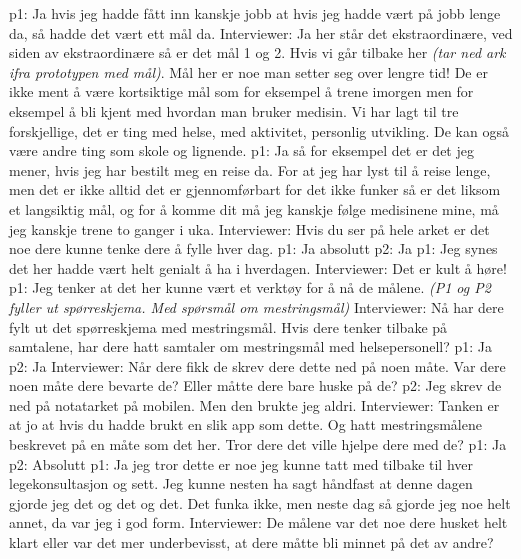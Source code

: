 \documentclass[11pt, norsk, a4paper]{article}
\begin{document}
\textcolor{myGreen} {p1: }Ja hvis jeg hadde fått inn kanskje jobb at hvis jeg hadde vært på jobb lenge da, så hadde det vært ett mål da.
\textcolor{myBlue} {Interviewer: }Ja her står det ekstraordinære, ved siden av ekstraordinære så er det mål 1 og 2. Hvis vi går tilbake her \textcolor{myGrey}{\textit{(tar ned ark ifra prototypen med mål)}}. Mål her er noe man setter seg over lengre tid! De er ikke ment å være kortsiktige mål som for eksempel å trene imorgen men for eksempel å bli kjent med hvordan man bruker medisin. Vi har lagt til tre forskjellige, det er ting med helse, med aktivitet, personlig utvikling. De kan også være andre ting som skole og lignende. 
\textcolor{myGreen} {p1: }Ja så for eksempel det er det jeg mener, hvis jeg har bestilt meg en reise da. For at jeg har lyst til å reise lenge, men det er ikke alltid det er gjennomførbart for det ikke funker så er det liksom et langsiktig mål, og for å komme dit må jeg kanskje følge medisinene mine, må jeg kanskje trene to ganger i uka.
\textcolor{myBlue} {Interviewer: }Hvis du ser på hele arket er det noe dere kunne tenke dere å fylle hver dag.
\textcolor{myGreen} {p1: }Ja absolutt
\textcolor{myYellow} {p2: }Ja
\textcolor{myGreen} {p1: }Jeg synes det her hadde vært helt genialt å ha i hverdagen.
\textcolor{myBlue} {Interviewer: }Det er kult å høre!
\textcolor{myGreen} {p1: }Jeg tenker at det her kunne vært et verktøy for å nå de målene. 
\textcolor{myGrey}{\textit{(P1 og P2 fyller ut spørreskjema. Med spørsmål om mestringsmål)}}
\textcolor{myBlue} {Interviewer: }Nå har dere fylt ut det spørreskjema med mestringsmål. Hvis dere tenker tilbake på samtalene, har dere hatt samtaler om mestringsmål med helsepersonell?
\textcolor{myGreen} {p1: }Ja
\textcolor{myYellow} {p2: }Ja
\textcolor{myBlue} {Interviewer: }Når dere fikk de skrev dere dette ned på noen måte. Var dere noen måte dere bevarte de? Eller måtte dere bare huske på de?
\textcolor{myYellow} {p2: }Jeg skrev de ned på notatarket på mobilen. Men den brukte jeg aldri.
\textcolor{myBlue} {Interviewer: }Tanken er at jo at hvis du hadde brukt en slik app som dette. Og hatt mestringsmålene beskrevet på en måte som det her. Tror dere det ville hjelpe dere med de?
\textcolor{myGreen} {p1: }Ja
\textcolor{myYellow} {p2: }Absolutt
\textcolor{myGreen} {p1: }Ja jeg tror dette er noe jeg kunne tatt med tilbake til hver legekonsultasjon og sett. Jeg kunne nesten ha sagt håndfast at denne dagen gjorde jeg det og det og det. Det funka ikke, men neste dag så gjorde jeg noe helt annet, da var jeg i god form.
\textcolor{myBlue} {Interviewer: }De målene var det noe dere husket helt klart eller var det mer underbevisst, at dere måtte bli minnet på det av andre?
\end{document}
